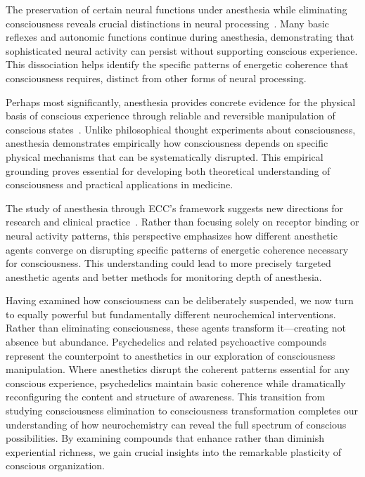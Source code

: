 The preservation of certain neural functions under anesthesia while eliminating consciousness reveals crucial distinctions in neural processing~\cite{da2024mathematical}. Many basic reflexes and autonomic functions continue during anesthesia, demonstrating that sophisticated neural activity can persist without supporting conscious experience. This dissociation helps identify the specific patterns of energetic coherence that consciousness requires, distinct from other forms of neural processing.

Perhaps most significantly, anesthesia provides concrete evidence for the physical basis of conscious experience through reliable and reversible manipulation of conscious states~\cite{zheng2025unbearable}. Unlike philosophical thought experiments about consciousness, anesthesia demonstrates empirically how consciousness depends on specific physical mechanisms that can be systematically disrupted. This empirical grounding proves essential for developing both theoretical understanding of consciousness and practical applications in medicine.

The study of anesthesia through ECC's framework suggests new directions for research and clinical practice~\cite{da2024mathematical}. Rather than focusing solely on receptor binding or neural activity patterns, this perspective emphasizes how different anesthetic agents converge on disrupting specific patterns of energetic coherence necessary for consciousness. This understanding could lead to more precisely targeted anesthetic agents and better methods for monitoring depth of anesthesia.

Having examined how consciousness can be deliberately suspended, we now turn to equally powerful but fundamentally different neurochemical interventions. Rather than eliminating consciousness, these agents transform it—creating not absence but abundance. Psychedelics and related psychoactive compounds represent the counterpoint to anesthetics in our exploration of consciousness manipulation. Where anesthetics disrupt the coherent patterns essential for any conscious experience, psychedelics maintain basic coherence while dramatically reconfiguring the content and structure of awareness. This transition from studying consciousness elimination to consciousness transformation completes our understanding of how neurochemistry can reveal the full spectrum of conscious possibilities. By examining compounds that enhance rather than diminish experiential richness, we gain crucial insights into the remarkable plasticity of conscious organization.
